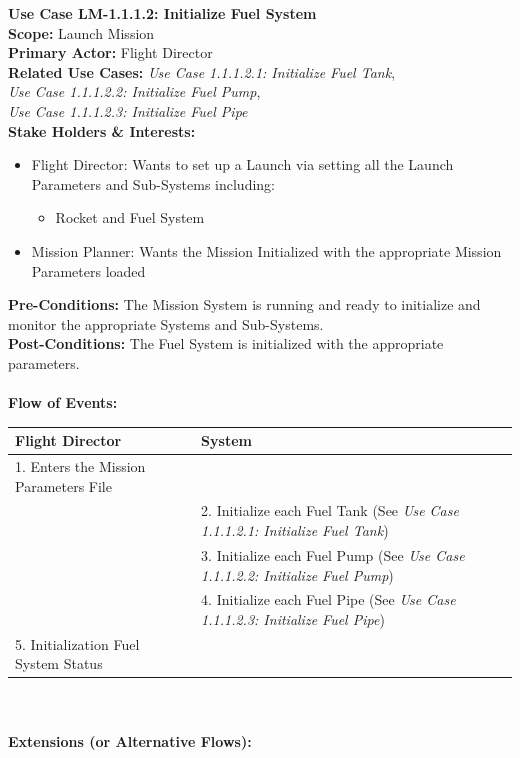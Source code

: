 \documentclass[letterpaper]{article}
\begin{document}
\noindent
\textbf{Use Case LM-1.1.1.2:  Initialize Fuel System}\\
\textbf{Scope:}  Launch Mission\\
\textbf{Primary Actor:}  Flight Director\\
\textbf{Related Use Cases:  } 
\textit{Use Case 1.1.1.2.1: Initialize Fuel Tank},\\ 
\textit{Use Case 1.1.1.2.2: Initialize Fuel Pump},\\ 
\textit{Use Case 1.1.1.2.3:  Initialize Fuel Pipe}\\
\textbf{Stake Holders \& Interests:}
\begin{itemize}
   \item Flight Director:  Wants to set up a Launch via setting all
      the Launch Parameters and Sub-Systems including:
   \begin{itemize}
      \item Rocket and Fuel System
   \end{itemize}
   \item Mission Planner:  Wants the Mission Initialized with the
      appropriate Mission Parameters loaded
\end{itemize}
\textbf{Pre-Conditions:  }The Mission System is running and ready to
initialize and monitor the appropriate Systems and Sub-Systems.\\
\textbf{Post-Conditions: }The Fuel System is initialized with the
appropriate parameters.\\\\
\textbf{Flow of Events:}\\
\begin{tabular}{|p{5.75cm}|p{5.75cm}|}\hline
   \textbf{Flight Director}&\textbf{System}\\\hline
   1. Enters the Mission Parameters File&\\\hline
   &2. Initialize each Fuel Tank (See 
   \textit{Use Case 1.1.1.2.1:  Initialize Fuel Tank})\\\hline
   &3. Initialize each Fuel Pump (See 
   \textit{Use Case 1.1.1.2.2:  Initialize Fuel Pump})\\\hline
   &4. Initialize each Fuel Pipe (See 
   \textit{Use Case 1.1.1.2.3:  Initialize Fuel Pipe})\\\hline
   5. Initialization Fuel System Status&\\\hline
\end{tabular}\\\\
\textbf{Extensions (or Alternative Flows):}
\end{document}
